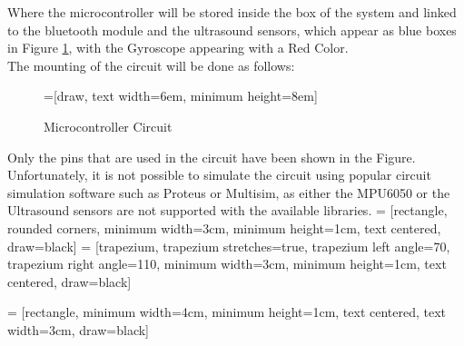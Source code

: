 \documentclass[12pt]{article}
\numberwithin{equation}{section}
\begin{document}
Where the microcontroller will be stored inside the box of the system and linked to the bluetooth module and the ultrasound sensors, which appear as blue boxes in Figure \ref{fig:system_architecture}, with the Gyroscope appearing with a Red Color.\\
The mounting of the circuit will be done as follows:
\begin{figure}[H]
  \centering

=[draw, text width=6em, minimum height=8em]


  \caption{Microcontroller Circuit}
  \label{fig:system_architecture}
\end{figure}
Only the pins that are used in the circuit have been shown in the Figure.
Unfortunately, it is not possible to simulate the circuit using popular circuit simulation software such as Proteus or Multisim, as either the MPU6050 or the Ultrasound sensors are not supported with the available libraries.
 = [rectangle, rounded corners, 
minimum width=3cm, 
minimum height=1cm,
text centered, 
draw=black]
 = [trapezium, 
trapezium stretches=true, %
trapezium left angle=70, 
trapezium right angle=110, 
minimum width=3cm, 
minimum height=1cm, text centered, 
draw=black]

 = [rectangle, 
minimum width=4cm, 
minimum height=1cm, 
text centered, 
text width=3cm, 
draw=black]
\end{document}
